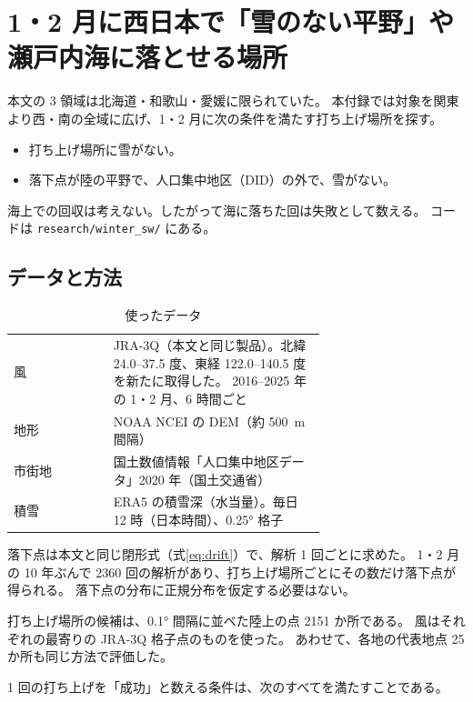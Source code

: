 \section{1・2 月に西日本で「雪のない平野」や瀬戸内海に落とせる場所}
\label{sec:winter-sw}

本文の 3 領域は北海道・和歌山・愛媛に限られていた。
本付録では対象を関東より西・南の全域に広げ、1・2 月に次の条件を満たす打ち上げ場所を探す。

\begin{itemize}
  \item 打ち上げ場所に雪がない。
  \item 落下点が陸の平野で、人口集中地区（DID）の外で、雪がない。
\end{itemize}

海上での回収は考えない。したがって海に落ちた回は失敗として数える。
コードは \texttt{research/winter\_sw/} にある。

\subsection{データと方法}

\begin{table}[H]
\centering
\caption{使ったデータ}
\label{tab:wsw-data}
\small
\begin{tabular}{@{}lp{0.68\linewidth}@{}}
\toprule
風 & JRA-3Q（本文と同じ製品）。北緯 24.0--37.5 度、東経 122.0--140.5 度を新たに取得した。
     2016--2025 年の 1・2 月、6 時間ごと \\
地形 & NOAA NCEI の DEM（約 \SI{500}{\metre} 間隔） \\
市街地 & 国土数値情報「人口集中地区データ」2020 年（国土交通省） \\
積雪 & ERA5 の積雪深（水当量）\citep{hersbach2020era5}。毎日 12 時（日本時間）、\ang{0.25} 格子 \\
\bottomrule
\end{tabular}
\end{table}

落下点は本文と同じ閉形式（式\eqref{eq:drift}）で、解析 1 回ごとに求めた。
1・2 月の 10 年ぶんで 2360 回の解析があり、打ち上げ場所ごとにその数だけ落下点が得られる。
落下点の分布に正規分布を仮定する必要はない。

打ち上げ場所の候補は、\ang{0.1} 間隔に並べた陸上の点 2151 か所である。
風はそれぞれの最寄りの JRA-3Q 格子点のものを使った。
あわせて、各地の代表地点 25 か所も同じ方法で評価した。

1 回の打ち上げを「成功」と数える条件は、次のすべてを満たすことである。


